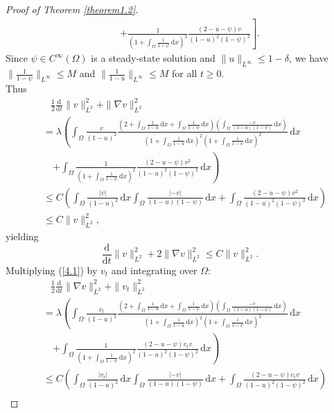 \documentclass{article}
\numberwithin{equation}{section}
\begin{document}
\begin{proof}[Proof of Theorem \ref{theorem1.2}]
\begin{align*}
    &\quad\ \left.+\frac{1}{(1+\int_{\Omega}\frac{1}{1-\psi}\,\mathrm{d}x)^2}\frac{(2-u-\psi)v}{(1-u)^2(1-\psi)^2}\right].
\end{align*}
Since $\psi\in C^{\infty}(\Omega)$ is a steady-state solution and $\|u\|_{L^{\infty}}\le 1-\delta$, we have $\|\frac{1}{1-\psi}\|_{L^{\infty}}\le M$ and $\|\frac{1}{1-u}\|_{L^{\infty}}\le M$ for all $t\ge 0$.\\
\noindent
Thus
\begin{align*}
    &\quad\frac{1}{2}\frac{\mathrm{d}}{\mathrm{d}t}\|v\|_{L^2}^2+\|\nabla v\|_{L^2}^2\\
    &\ =\lambda\left(\int_{\Omega}\frac{v}{(1-u)^2}\frac{(2+\int_{\Omega}\frac{1}{1-u}\,\mathrm{d}x+\int_{\Omega}\frac{1}{1-\psi}\,\mathrm{d}x)(\int_{\Omega}\frac{-v}{(1-u)(1-\psi)}\,\mathrm{d}x)}{(1+\int_{\Omega}\frac{1}{1-u}\,\mathrm{d}x)^2(1+\int_{\Omega}\frac{1}{1-\psi}\,\mathrm{d}x)^2}\,\mathrm{d}x\right.\\
    &\quad\ \left.+\int_{\Omega}\frac{1}{(1+\int_{\Omega}\frac{1}{1-\psi}\,\mathrm{d}x)^2}\frac{(2-u-\psi)v^2}{(1-u)^2(1-\psi)^2}\,\mathrm{d}x\right)\\
    &\ \le C\left(\int_{\Omega}\frac{|v|}{(1-u)^2}\,\mathrm{d}x\int_{\Omega}\frac{|-v|}{(1-u)(1-\psi)}\,\mathrm{d}x+\int_{\Omega}\frac{(2-u-\psi)v^2}{(1-u)^2(1-\psi)^2}\,\mathrm{d}x\right)\\
    &\ \le C\|v\|_{L^2}^{2},
\end{align*}
yielding
\begin{equation}
    \frac{\mathrm{d}}{\mathrm{d}t}\|v\|_{L^2}^2+2\|\nabla v\|_{L^2}^2\le C\|v\|_{L^2}^{2}.\label{4.2}
\end{equation}
Multiplying (\ref{4.1}) by $v_t$ and integrating over $\Omega$:
\begin{align*}
    &\quad\frac{1}{2}\frac{\mathrm{d}}{\mathrm{d}t}\|\nabla v\|_{L^2}^2+\|v_t\|_{L^2}^2\\
    &\ =\lambda\left(\int_{\Omega}\frac{v_t}{(1-u)^2}\frac{(2+\int_{\Omega}\frac{1}{1-u}\,\mathrm{d}x+\int_{\Omega}\frac{1}{1-\psi}\,\mathrm{d}x)(\int_{\Omega}\frac{-v}{(1-u)(1-\psi)}\,\mathrm{d}x)}{(1+\int_{\Omega}\frac{1}{1-u}\,\mathrm{d}x)^2(1+\int_{\Omega}\frac{1}{1-\psi}\,\mathrm{d}x)^2}\,\mathrm{d}x\right.\\
    &\quad\ \left.+\int_{\Omega}\frac{1}{(1+\int_{\Omega}\frac{1}{1-\psi}\,\mathrm{d}x)^2}\frac{(2-u-\psi)v_t v}{(1-u)^2(1-\psi)^2}\,\mathrm{d}x\right)\\
    &\ \le C\left(\int_{\Omega}\frac{|v_t|}{(1-u)^2}\,\mathrm{d}x\int_{\Omega}\frac{|-v|}{(1-u)(1-\psi)}\,\mathrm{d}x+\int_{\Omega}\frac{(2-u-\psi)v_t v}{(1-u)^2(1-\psi)^2}\,\mathrm{d}x\right)\\

\end{align*}
\end{proof}
\end{document}
